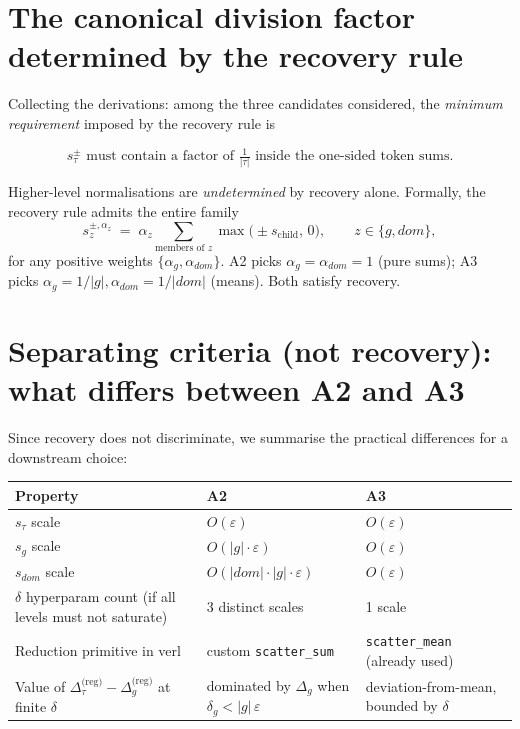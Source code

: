 \documentclass[11pt]{article}
\begin{document}
\section{The canonical division factor determined by the recovery rule}

Collecting the derivations: among the three candidates considered, the
\emph{minimum requirement} imposed by the recovery rule is

\[
\boxed{\quad
s_\tau^\pm \text{ must contain a factor of }\tfrac{1}{|\tau|}\text{ inside the one-sided token sums.}
\quad}
\]

Higher-level normalisations are \emph{undetermined} by recovery alone.
Formally, the recovery rule admits the entire family
\[
s_z^{\pm,\alpha_z}
  \;=\; \alpha_z \sum_{\text{members of }z}\max\bigl(\pm s_{\text{child}},\,0\bigr),
  \qquad z\in\{g, dom\},
\]
for any positive weights $\{\alpha_g,\alpha_{dom}\}$. A2 picks
$\alpha_g=\alpha_{dom}=1$ (pure sums); A3 picks
$\alpha_g=1/|g|,\alpha_{dom}=1/|dom|$ (means). Both satisfy recovery.

\section{Separating criteria (not recovery): what differs between A2 and A3}

Since recovery does not discriminate, we summarise the practical
differences for a downstream choice:

\begin{center}
\renewcommand{\arraystretch}{1.2}
\begin{tabular}{l l l}
\textbf{Property} & \textbf{A2} & \textbf{A3} \\ \hline
$s_\tau$ scale        & $O(\varepsilon)$                & $O(\varepsilon)$ \\
$s_g$ scale           & $O(|g|\cdot\varepsilon)$        & $O(\varepsilon)$ \\
$s_{dom}$ scale       & $O(|dom|\cdot|g|\cdot\varepsilon)$ & $O(\varepsilon)$ \\
$\delta$ hyperparam count (if all levels must not saturate) & 3 distinct scales & 1 scale \\
Reduction primitive in verl       & custom \texttt{scatter\_sum}   & \texttt{scatter\_mean} (already used) \\
Value of $\Delta_\tau^{\text{(reg)}}-\Delta_g^{\text{(reg)}}$ at finite $\delta$ & dominated by $\Delta_g$ when $\delta_g < |g|\,\varepsilon$ & deviation-from-mean, bounded by $\delta$ \\
\end{tabular}
\end{center}
\end{document}
